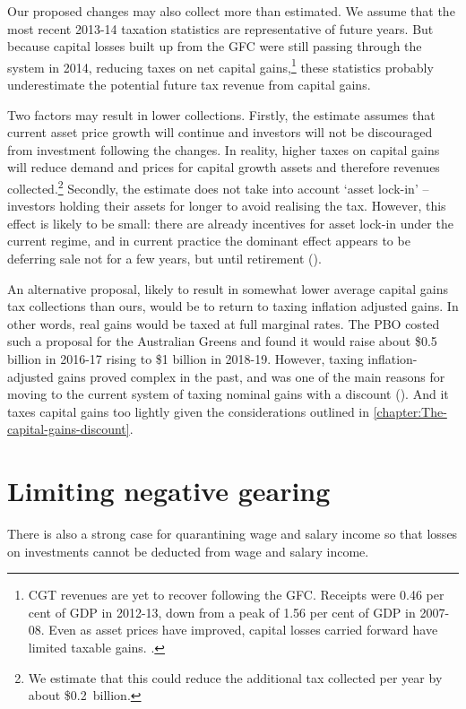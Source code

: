 Our proposed changes may also collect more than estimated. We assume that the most recent 2013-14 taxation statistics are representative of future years. But because capital losses built up from the GFC were still passing through the system in 2014, reducing taxes on net capital gains,\footnote{CGT revenues are yet to recover following the GFC. Receipts were 0.46 per cent of GDP in 2012-13, down from a peak of 1.56 per cent of GDP in 2007-08. Even as asset prices have improved, capital losses carried forward have limited taxable gains. \textcites{PBO2014TrendsAustralianGovtReceipts1982to2013}{StewartMooreWhitefordEtAl2015}.} these statistics probably underestimate the potential future tax revenue from capital gains. 

Two factors may result in lower collections. 
Firstly, the estimate assumes that current asset price growth will continue and investors will not be discouraged from investment following the changes. 
In reality, higher taxes on capital gains will reduce demand and prices for capital growth assets and therefore revenues collected.\footnote{We estimate that this could reduce the additional tax collected per year by about \$0.2~billion.} 
Secondly, the estimate does not take into account ‘asset lock-in’ – investors holding their assets for longer to avoid realising the tax. 
However, this effect is likely to be small: there are already incentives for asset lock-in under the current regime, and in current practice the dominant effect appears to be deferring sale not for a few years, but until retirement (). 

An alternative proposal, likely to result in somewhat lower average capital gains tax collections than ours, would be to return to taxing inflation adjusted gains.  
In other words, real gains would be taxed at full marginal rates. The PBO costed such a proposal for the Australian Greens and found it would raise about \$0.5 billion in 2016-17 rising to \$1 billion in 2018-19.  
However, taxing inflation-adjusted gains proved complex in the past, and was one of the main reasons for moving to the current system of taxing nominal gains with a discount (). 
And it taxes capital gains too lightly given the considerations outlined in \cref{chapter:The-capital-gains-discount}.

\section{Limiting negative gearing}
There is also a strong case for quarantining wage and salary income so that losses on investments cannot be deducted from wage and salary income. 
